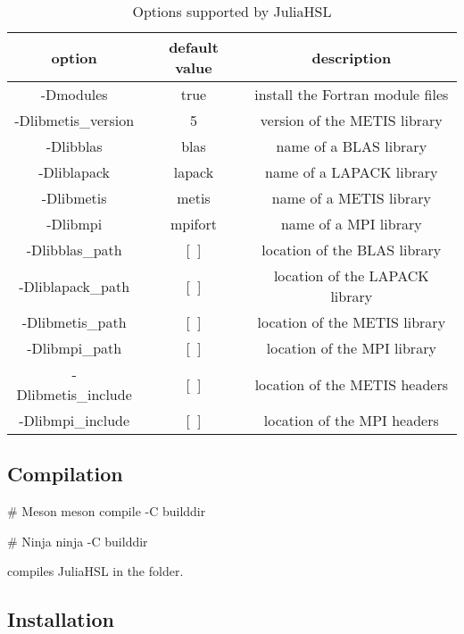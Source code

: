 \documentclass[gdweb]{geradwp}
\newcommand{\JuliaHSL}{JuliaHSL\xspace}  %
\begin{document}
\begin{table}[ht]
  \label{tab:options}
  \centering
  \begin{tabular}{|c|c|c|}
    \hline
    option              & default value & description                      \\ \hline
    -Dmodules           & true          & install the Fortran module files \\ \hline
    -Dlibmetis\_version & 5             & version of the METIS library     \\ \hline
    -Dlibblas           & blas          & name of a BLAS library           \\ \hline
    -Dliblapack         & lapack        & name of a LAPACK library         \\ \hline
    -Dlibmetis          & metis         & name of a METIS library          \\ \hline
    -Dlibmpi            & mpifort       & name of a MPI library            \\ \hline
    -Dlibblas\_path     & [~]           & location of the BLAS library     \\ \hline
    -Dliblapack\_path   & [~]           & location of the LAPACK library   \\ \hline
    -Dlibmetis\_path    & [~]           & location of the METIS library    \\ \hline
    -Dlibmpi\_path      & [~]           & location of the MPI library      \\ \hline
    -Dlibmetis\_include & [~]           & location of the METIS headers    \\ \hline
    -Dlibmpi\_include   & [~]           & location of the MPI headers      \\ \hline
  \end{tabular}
  \caption{Options supported by \JuliaHSL}
\end{table}

\subsection{Compilation}

\begin{jllisting}
# Meson
meson compile -C builddir

# Ninja
ninja -C builddir
\end{jllisting}
compiles \JuliaHSL in the  folder.

\subsection{Installation}
\end{document}
